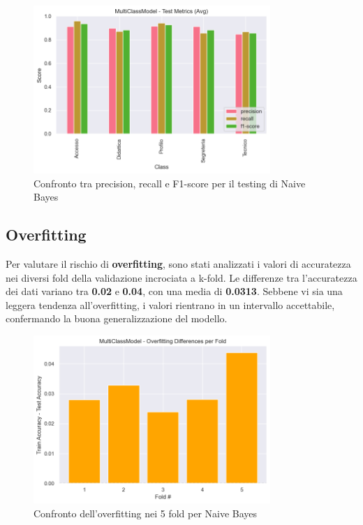 \begin{figure}[H]
    \centering
    \includegraphics[width=0.8\textwidth]{images/metrics_test_naive_bayes.png}
    \caption{Confronto tra precision, recall e F1-score per il testing di Naive Bayes}
    \label{fig:metrics_test_naive_bayes}
\end{figure}

\subsection{Overfitting}

Per valutare il rischio di \textbf{overfitting}, sono stati analizzati i valori di accuratezza nei diversi fold della validazione incrociata a k-fold. Le differenze tra l'accuratezza dei dati variano tra \textbf{0.02} e \textbf{0.04}, con una media di \textbf{0.0313}. Sebbene vi sia una leggera tendenza all'overfitting, i valori rientrano in un intervallo accettabile, confermando la buona generalizzazione del modello.

\begin{figure}[H]
    \centering
    \includegraphics[width=0.8\textwidth]{images/overfitting_naive_bayes.png}
    \caption{Confronto dell'overfitting nei 5 fold per Naive Bayes}
    \label{fig:overfitting_naive_bayes}
\end{figure}

